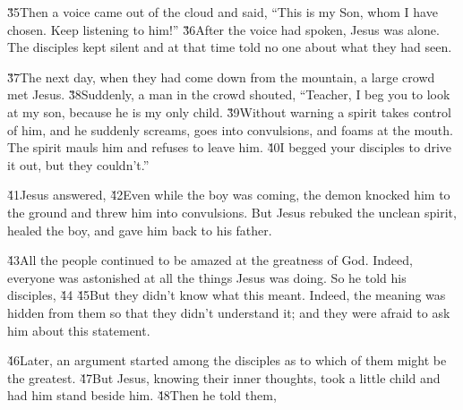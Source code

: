 \v{35}Then a voice came out of the cloud and said, ``This is my Son, whom I have chosen. Keep listening to him!'' \v{36}After the voice had spoken, Jesus was alone. The disciples kept silent and at that time told no one about what they had seen.

\v{37}The next day, when they had come down from the mountain, a large crowd met Jesus. \v{38}Suddenly, a man in the crowd shouted, ``Teacher, I beg you to look at my son, because he is my only child. \v{39}Without warning a spirit takes control of him, and he suddenly screams, goes into convulsions, and foams at the mouth. The spirit mauls him and refuses to leave him. \v{40}I begged your disciples to drive it out, but they couldn't.''

\v{41}Jesus answered,  \v{42}Even while the boy was coming, the demon knocked him to the ground and threw him into convulsions. But Jesus rebuked the unclean spirit, healed the boy, and gave him back to his father.

\v{43}All the people continued to be amazed at the greatness of God. Indeed, everyone was astonished at all the things Jesus was doing. So he told his disciples, \v{44}  \v{45}But they didn't know what this meant. Indeed, the meaning was hidden from them so that they didn't understand it; and they were afraid to ask him about this statement.

\v{46}Later, an argument started among the disciples as to which of them might be the greatest. \v{47}But Jesus, knowing their inner thoughts, took a little child and had him stand beside him. \v{48}Then he told them, 

